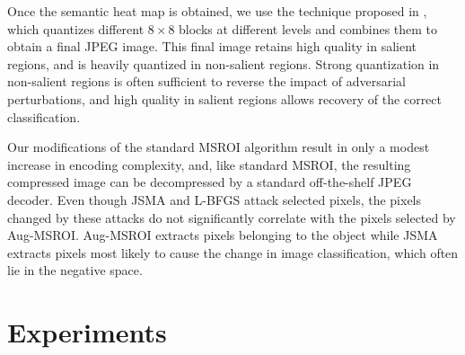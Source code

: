 Once the semantic heat map is obtained, we use the technique proposed in \cite{Prakash2017SemanticPI}, which quantizes different $8\times8$ blocks at different levels and combines them to obtain a final JPEG image. 
This final image retains high quality in salient regions, and is heavily quantized in non-salient regions.
Strong quantization in non-salient regions is often sufficient to reverse the impact of adversarial perturbations, and high quality in salient regions allows recovery of the correct classification.


Our modifications of the standard MSROI algorithm result in only a modest increase in encoding complexity, and, like standard MSROI, the resulting compressed image can be decompressed by a standard off-the-shelf JPEG decoder.
Even though JSMA and L-BFGS attack selected pixels, the pixels changed by these attacks do not significantly correlate with the pixels selected by Aug-MSROI. Aug-MSROI extracts pixels belonging to the object while JSMA extracts pixels most likely to cause the change in image classification, which often lie in the negative space.


\section{Experiments}

